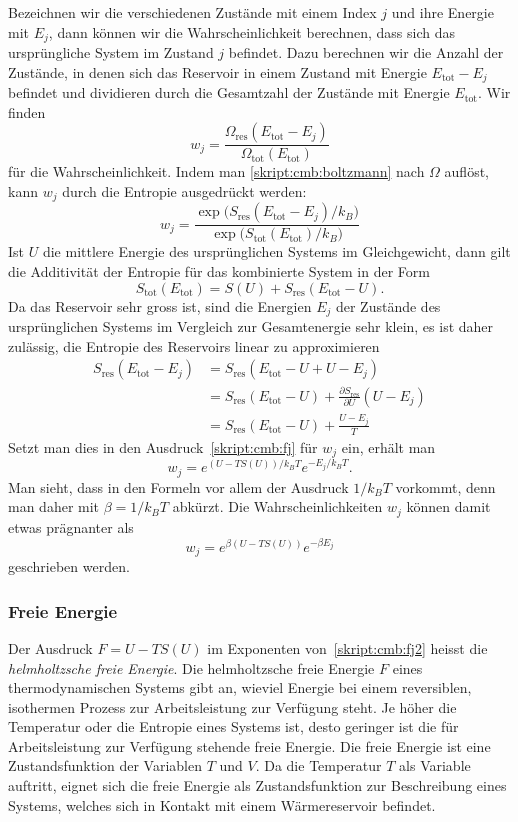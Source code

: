 Bezeichnen wir die verschiedenen Zustände mit einem Index $j$
und ihre Energie mit $E_j$, dann können wir die Wahrscheinlichkeit
berechnen, dass sich das ursprüngliche System im Zustand $j$ befindet.
Dazu berechnen wir die Anzahl der Zustände, in denen sich das 
Reservoir in einem Zustand mit Energie $E_\text{tot} - E_j$ befindet
und dividieren durch die Gesamtzahl der Zustände mit Energie $E_\text{tot}$.
Wir finden
\[
w_j
=
\frac{\Omega_\text{res}(E_\text{tot}-E_j)}{\Omega_\text{tot}(E_\text{tot})}
\]
für die Wahrscheinlichkeit.
Indem man \eqref{skript:cmb:boltzmann} nach $\Omega$ auflöst, kann $w_j$
durch die Entropie ausgedrückt werden:
\begin{equation}
w_j
=
\frac{\exp\bigl(S_\text{res}(E_\text{tot}-E_j)/k_B\bigr)}{\exp\bigl(S_\text{tot}(E_\text{tot})/k_B\bigr)}
\label{skript:cmb:fj}
\end{equation}
Ist $U$ die mittlere Energie des ursprünglichen Systems im Gleichgewicht,
dann gilt die Additivität der Entropie für das kombinierte System in der Form
\[
S_\text{tot}(E_\text{tot})
=
S(U) + S_\text{res}(E_\text{tot}-U).
\]
Da das Reservoir sehr gross ist, sind die Energien $E_j$ der Zustände des
ursprünglichen Systems im Vergleich zur Gesamtenergie sehr klein,
es ist daher zulässig, die Entropie des Reservoirs linear zu approximieren
\begin{align*}
S_\text{res}(E_\text{tot}-E_j)
&=
S_\text{res}(E_\text{tot}-U+U-E_j)
\\
&=
S_\text{res}(E_\text{tot}-U) + \frac{\partial S_\text{res}}{\partial U}(U-E_j)
\\
&=
S_\text{res}(E_\text{tot}-U) + \frac{U-E_j}{T}
\end{align*}
Setzt man dies in den Ausdruck~\eqref{skript:cmb:fj} für $w_j$ ein, 
erhält man
\[
w_j = e^{(U-TS(U))/k_BT} e^{-E_j/k_BT}.
\]
Man sieht, dass in den Formeln vor allem der Ausdruck $1/k_BT$ vorkommt,
denn man daher mit $\beta=1/k_BT$ abkürzt.
Die Wahrscheinlichkeiten $w_j$ können damit etwas prägnanter als
\begin{equation}
w_j = e^{\beta(U-TS(U))}e^{-\beta E_j}
\label{skript:cmb:fj2}
\end{equation}
geschrieben werden.

\subsubsection{Freie Energie}
Der Ausdruck $F=U-TS(U)$ im Exponenten von~\eqref{skript:cmb:fj2}
heisst die {\em helmholtzsche freie Energie}.
Die helmholtzsche freie Energie $F$ eines thermodynamischen Systems
gibt an, wieviel Energie bei einem reversiblen, isothermen Prozess zur
Arbeitsleistung zur Verfügung steht. 
Je höher die Temperatur oder die Entropie eines Systems ist, desto geringer
ist die für Arbeitsleistung zur Verfügung stehende freie Energie.
Die freie Energie ist eine Zustandsfunktion der Variablen $T$ und $V$.
Da die Temperatur $T$ als Variable auftritt, eignet sich die freie
Energie als Zustandsfunktion zur Beschreibung eines Systems, welches
sich in Kontakt mit einem Wärmereservoir befindet.

